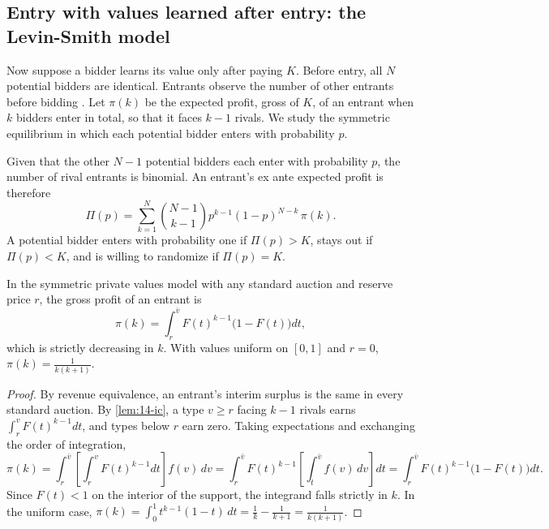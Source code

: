 \subsection{Entry with values learned after entry: the Levin-Smith model}\label{sec:14-entry-ls}

Now suppose a bidder learns its value only after paying $K$. Before entry, all $N$ potential bidders
are identical. Entrants observe the number of other entrants before bidding
\citep[Section 6.3.2]{AtheyHaile2007}. Let $\pi(k)$ be the expected profit, gross of $K$, of an
entrant when $k$ bidders enter in total, so that it faces $k-1$ rivals. We study the symmetric
equilibrium in which each potential bidder enters with probability $p$.

Given that the other $N-1$ potential bidders each enter with probability $p$, the number of rival
entrants is binomial. An entrant's ex ante expected profit is therefore
\begin{equation}\label{eq:14-entry-indiff}
\Pi(p)=\sum_{k=1}^{N}\binom{N-1}{k-1}p^{k-1}(1-p)^{N-k}\,\pi(k).
\end{equation}
A potential bidder enters with probability one if $\Pi(p)>K$, stays out if $\Pi(p)<K$, and is willing
to randomize if $\Pi(p)=K$.

\begin{lemma}\label{lem:14-pi-decreasing}
In the symmetric private values model with any standard auction and reserve price $r$, the gross
profit of an entrant is
\begin{equation}\label{eq:14-pik}
\pi(k)=\int_r^{\bar v}F(t)^{k-1}\bigl(1-F(t)\bigr)dt ,
\end{equation}
which is strictly decreasing in $k$. With values uniform on $[0,1]$ and $r=0$,
$\pi(k)=\frac{1}{k(k+1)}$.
\end{lemma}

\begin{proof}
By revenue equivalence, an entrant's interim surplus is the same in every standard auction. By
\cref{lem:14-ic}, a type $v\ge r$ facing $k-1$ rivals earns $\int_r^vF(t)^{k-1}dt$, and types below
$r$ earn zero. Taking expectations and exchanging the order of integration,
\[
\pi(k)=\int_r^{\bar v}\left[\int_r^{v}F(t)^{k-1}dt\right]f(v)\,dv
=\int_r^{\bar v}F(t)^{k-1}\left[\int_t^{\bar v}f(v)\,dv\right]dt
=\int_r^{\bar v}F(t)^{k-1}\bigl(1-F(t)\bigr)dt .
\]
Since $F(t)<1$ on the interior of the support, the integrand falls strictly in $k$. In the uniform
case, $\pi(k)=\int_0^1t^{k-1}(1-t)\,dt=\frac{1}{k}-\frac{1}{k+1}=\frac{1}{k(k+1)}$.
\end{proof}

